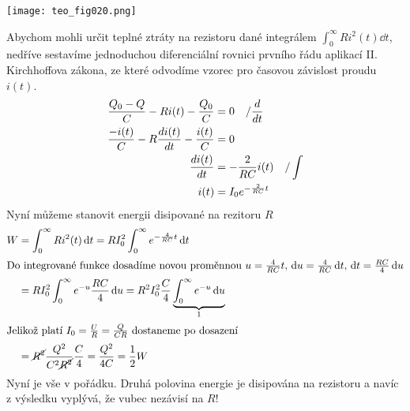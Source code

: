 \begin{example}
   {\centering
    \captionsetup{type=figure}
    \texttt{[image: teo\_fig020.png]}
    \label{teo:fig020}
  \par}
  
  Abychom mohli určit teplné ztráty na rezistoru dané integrálem \(\int_{0}^{\infty} 
  Ri^2(t)\dd{t}\), nedříve sestavíme jednoduchou diferenciální rovnici prvního řádu aplikací II. 
  Kirchhoffova zákona, ze které odvodíme vzorec pro časovou závislost proudu \(i(t)\). 
  \begin{align*}
    \frac{Q_0 - Q}{C} - Ri(t) - \frac{Q_0}{C}         &= 0 \quad/\dfrac{d  }{d t}             \\
    \frac{-i(t)}{C} - R\dfrac{d i(t)}{d t} - \frac{i(t)}{C} &= 0                              \\
                                        \dfrac{d i(t)}{d t} &= - \frac{2}{RC}i(t) \quad/\int  \\
                                                 i(t) &= I_0e^{-\frac{2}{RC}t}
  \end{align*}
  Nyní můžeme stanovit energii disipované na rezitoru \(R\)
  \begin{align*}
    W   &= \int_{0}^{\infty}Ri^2(t)\dd{t} = RI_0^2\int_{0}^{\infty}e^{-\frac{4}{RC}t}\dd{t}   \\
    \shortintertext{Do integrované funkce dosadíme novou proměnnou \(u = \frac{4}{RC}t\), \(\dd{u} 
                    = \frac{4}{RC}\dd{t}\), \(\dd{t} = \frac{RC}{4}\dd{u}\)}
        &= RI_0^2\int_{0}^{\infty}e^{-u}\frac{RC}{4}\dd{u} 
         = R^2I_0^2\frac{C}{4}\underbrace{\int_{0}^{\infty}e^{-u}\dd{u}}_1  \\
    \shortintertext{Jelikož platí \(I_0 = \frac{U}{R}=\frac{Q}{CR}\) dostaneme po dosazení}
        &= \cancel{R^2}\frac{Q^2}{C^2\cancel{R^2}}\frac{C}{4} = \frac{Q^2}{4C}
         = \frac{1}{2}W
  \end{align*}
  Nyní je vše v pořádku. Druhá polovina energie je disipována na rezistoru a navíc z výsledku 
  vyplývá, že vubec nezávisí na \(R\)!
\end{example}


